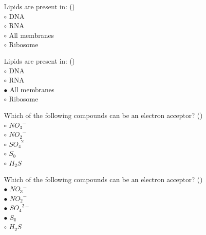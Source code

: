 \documentclass[]{beamer}
\begin{document}
\begin{frame}[shrink] {}
\addtocounter{questions}{1}
\color{blue}
Lipids are present in:   ()\\
\color{black}
\setlength{\parindent}{-0.4cm}
{\color{red}$\circ$} DNA\\
{\color{red}$\circ$} RNA\\
{\color{red}$\circ$} All membranes\\
{\color{red}$\circ$} Ribosome \\
\end{frame}
\begin{frame}[shrink] {}
\addtocounter{answers}{1}
\color{blue}
Lipids are present in:   ()\\
\color{black}
\setlength{\parindent}{-0.4cm}
{\color{red}$\circ$} DNA\\
{\color{red}$\circ$} RNA\\
{\color{red}$\bullet$} All membranes\\
{\color{red}$\circ$} Ribosome \\
\end{frame}

\begin{frame}[shrink] {}
\addtocounter{questions}{1}
\color{blue}
Which of the following compounds can be an electron acceptor?   ()\\
\color{black}
\setlength{\parindent}{-0.4cm}
{\color{red}$\circ$}  ${NO_{3}}^{-}$\\
{\color{red}$\circ$} ${NO_{2}}^{-}$\\
{\color{red}$\circ$} ${SO_{4}}^{2-}$\\
{\color{red}$\circ$} $S_0$\\
{\color{red}$\circ$} $H_{2}S$ \\
\end{frame}
\begin{frame}[shrink] {}
\addtocounter{answers}{1}
\color{blue}
Which of the following compounds can be an electron acceptor?   ()\\
\color{black}
\setlength{\parindent}{-0.4cm}
{\color{red}$\bullet$}  ${NO_{3}}^{-}$\\
{\color{red}$\bullet$} ${NO_{2}}^{-}$\\
{\color{red}$\bullet$} ${SO_{4}}^{2-}$\\
{\color{red}$\bullet$} $S_0$\\
{\color{red}$\circ$} $H_{2}S$ \\
\end{frame}
\end{document}
